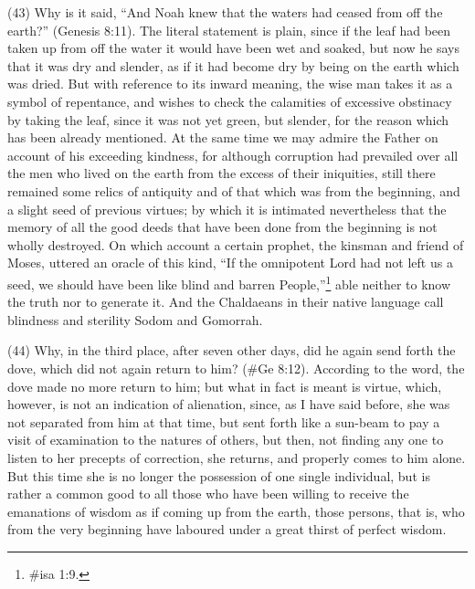 (43) Why is it said, ``And Noah knew that the waters had ceased from off the earth?'' (Genesis
8:11). The literal statement is plain, since if the leaf had been taken up from off the water it would
have been wet and soaked, but now he says that it was dry and slender, as if it had become dry by
being on the earth which was dried. But with reference to its inward meaning, the wise man takes it
as a symbol of repentance, and wishes to check the calamities of excessive obstinacy by taking
the leaf, since it was not yet green, but slender, for the reason which has been already mentioned.
At the same time we may admire the Father on account of his exceeding kindness, for although
corruption had prevailed over all the men who lived on the earth from the excess of their iniquities,
still there remained some relics of antiquity and of that which was from the beginning, and a slight
seed of previous virtues; by which it is intimated nevertheless that the memory of all the good
deeds that have been done from the beginning is not wholly destroyed. On which account a certain
prophet, the kinsman and friend of Moses, uttered an oracle of this kind, ``If the omnipotent Lord
had not left us a seed, we should have been like blind and barren People,''\footnote{\#isa 1:9.} able neither
to know the truth nor to generate it. And the Chaldaeans in their native language call blindness and
sterility Sodom and Gomorrah.

(44) Why, in the third place, after seven other days, did he again send forth the dove, which did not
again return to him? (\#Ge 8:12). According to the word, the dove made no more return to him;
but what in fact is meant is virtue, which, however, is not an indication of alienation, since, as I
have said before, she was not separated from him at that time, but sent forth like a sun-beam to
pay a visit of examination to the natures of others, but then, not finding any one to listen to her
precepts of correction, she returns, and properly comes to him alone. But this time she is no longer
the possession of one single individual, but is rather a common good to all those who have been
willing to receive the emanations of wisdom as if coming up from the earth, those persons, that is,
who from the very beginning have laboured under a great thirst of perfect wisdom.

